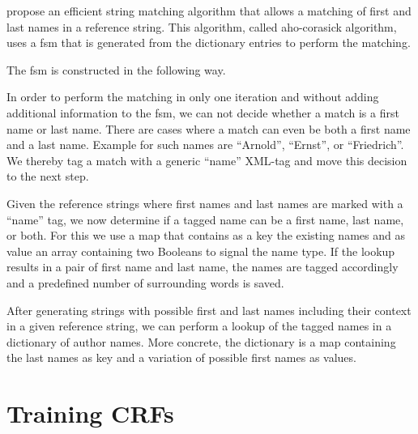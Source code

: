 \bigskip

\citet{aho1975efficient} propose an efficient string matching algorithm that allows a matching of first and last names in a reference string.
This algorithm, called \gls{aho-corasick algorithm}, uses a \gls{fsm} that is generated from the dictionary entries to perform the matching.

The \gls{fsm} is constructed in the following way.


In order to perform the matching in only one iteration and without adding additional information to the \gls{fsm}, we can not decide whether a match is a first name or last name.
There are cases where a match can even be both a first name and a last name.
Example for such names are ``Arnold'', ``Ernst'', or ``Friedrich''.
We thereby tag a match with a generic ``name'' XML-tag and move this decision to the next step.

\bigskip

Given the reference strings where first names and last names are marked with a ``name'' tag, we now determine if a tagged name can be a first name, last name, or both.
For this we use a map that contains as a key the existing names and as value an array containing two Booleans to signal the name type.
If the lookup results in a pair of first name and last name, the names are tagged accordingly and a predefined number of surrounding words is saved.

After generating strings with possible first and last names including their context in a given reference string, we can perform a lookup of the tagged names in a dictionary of author names.
More concrete, the dictionary is a map containing the last names as key and a variation of possible first names as values.





\section{Training CRFs}\label{sec:ae-training-crfs}


